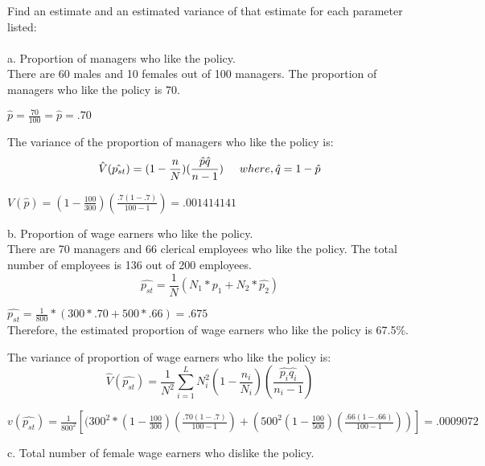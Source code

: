 \documentclass{article}
\begin{document}
Find an estimate and an estimated variance of that estimate for each parameter listed: \\
\\
\medskip
a. Proportion of managers who like the policy. \\
There are 60 males and 10 females out of 100 managers. The proportion of managers who like the policy is 70. 
\begin{center}
$\hat{p} = \frac{70}{100} = \hat{p} = .70 $\\
\end{center}
The variance of the proportion of managers who like the policy is: 
\begin{equation}
    \hat{V}(\hat{p_{st}}) = (1 - \frac{n}{N}) (\frac{\hat{p} \hat{q}}{n - 1}) \hspace{.5cm} where,  \hat{q} = 1 - \hat{p} \\
\end{equation}
\begin{center}
    $V(\hat{p}) = (1- \frac{100}{300}) (\frac{.7(1-.7)}{100-1}) = .001414141 $
\end{center}
\medskip
b. Proportion of wage earners who like the policy. \\
There are 70 managers and 66 clerical employees who like the policy. The total number of employees is 136 out of 200 employees. 
\begin{equation}
    \hat{p_{st}} = \frac{1}{N} (N_1*\hat{p_1} + N_2*\hat{p_2})
\end{equation}
\begin{center}
    $\hat{p_{st}} = \frac{1}{800}*(300*.70 + 500*.66) = .675 $ \\
    Therefore, the estimated proportion of wage earners who like the policy is 67.5\%.
\end{center}
The variance of proportion of wage earners who like the policy is: 
\begin{equation}
    \hat{V}(\hat{p_{st}}) = \frac{1}{N^2} \sum^L_{i=1} N^2_i (1- \frac{n_i}{N_i})(\frac{\hat{p_i} \hat{q_i}}{n_i - 1})
\end{equation}
\begin{center}
    $v(\hat{p_{st}}) = \frac{1}{800^2} [(300^2*(1- \frac{100}{300}) (\frac{.70(1-.7)}{100-1}) + (500^2 (1- \frac{100}{500})(\frac{.66(1-.66)}{100-1}))] = .0009072 $
\end{center}
\medskip
c. Total number of female wage earners who dislike the policy. \\
\end{document}
